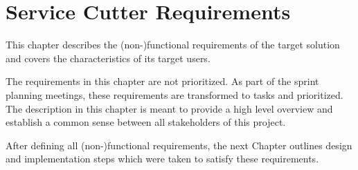 
\chapter{Service Cutter Requirements}
\label{cha:requirements}

This chapter describes the (non-)functional requirements of the target solution and covers the characteristics of its target users. 

The requirements in this chapter are not prioritized. As part of the sprint planning meetings, these requirements are transformed to tasks and prioritized. The description in this chapter is meant to provide a high level overview and establish a common sense between all stakeholders of this project.







\bigskip

After defining all (non-)functional requirements, the next Chapter outlines design and implementation steps which were taken to satisfy these requirements.

